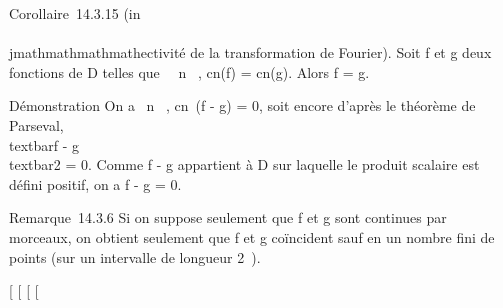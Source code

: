 Corollaire~14.3.15 (in\\\\jmathmathmathmathectivité de la transformation de Fourier). Soit f
et g deux fonctions de D telles que \forall~~n \in {}~,
cn(f) = cn(g). Alors f = g.

Démonstration On a \forall~n \in {}~, cn~(f - g)
= 0, soit encore d'après le théorème de Parseval,
\\textbar{}f - g\\textbar{}2 =
0. Comme f - g appartient à D sur laquelle le produit scalaire est
défini positif, on a f - g = 0.

Remarque~14.3.6 Si on suppose seulement que f et g sont continues par
morceaux, on obtient seulement que f et g coïncident sauf en un nombre
fini de points (sur un intervalle de longueur 2\pi~).

{[}
{[}
{[}
{[}

